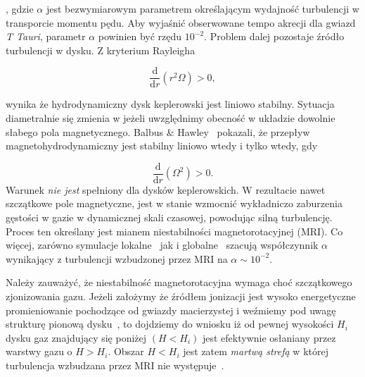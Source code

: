 , gdzie $\alpha$ jest bezwymiarowym parametrem określającym wydajność
turbulencji w transporcie momentu pędu. Aby wyjaśnić obserwowane tempo akrecji
dla gwiazd \emph{T Tauri}, parametr $\alpha$ powinien być rzędu $10^{-2}$.
Problem dalej pozostaje źródło turbulencji w dysku. Z kryterium
Rayleigha

\begin{equation}
   \frac{\mathrm{d}}{\mathrm{d}r}\left(r^2\Omega\right) > 0,
\end{equation}

wynika że hydrodynamiczny dysk keplerowski jest liniowo stabilny. Sytuacja
diametralnie się zmienia w jeżeli uwzględnimy obecność w układzie dowolnie
słabego pola magnetycznego. Balbus \& Hawley~\citep{BH91} pokazali, że przepływ
magnetohydrodynamiczny jest stabilny liniowo wtedy i tylko wtedy, gdy

\begin{equation}\label{eq:mri}
   \frac{\mathrm{d}}{\mathrm{d}r}\left(\Omega^2\right) > 0.
\end{equation}
Warunek  \emph{nie jest} spełniony dla dysków keplerowskich. W
rezultacie nawet szczątkowe pole magnetyczne, jest w stanie wzmocnić wykładniczo
zaburzenia gęstości w gazie w dynamicznej skali czasowej, powodując silną
turbulencję. Proces ten określany jest mianem niestabilności magnetorotacyjnej
(MRI). Co więcej, zarówno symulacje lokalne~\cite{DSP10} jak
i globalne~\cite{FD11} szacują współczynnik $\alpha$ wynikający z turbulencji
wzbudzonej przez MRI na $\alpha\sim 10^{-2}$.
\par Należy zauważyć, że niestabilność magnetorotacyjna wymaga choć szczątkowego
zjonizowania gazu. Jeżeli założymy że źródłem jonizacji jest wysoko energetyczne
promieniowanie pochodzące od gwiazdy macierzystej i weźmiemy pod uwagę strukturę
pionową dysku~, to dojdziemy do wniosku iż od pewnej wysokości
$H_i$ dysku gaz znajdujący się poniżej $(H < H_i)$ jest efektywnie osłaniany
przez warstwy gazu o $H > H_i$. Obszar $H < H_i$ jest zatem \emph{martwą strefą}
w której turbulencja wzbudzana przez MRI nie występuje~\cite{DFT10}.


